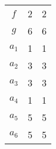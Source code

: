 \begin{center}
\begin{minipage}[t]{.4\linewidth}
\begin{longtable}[c]{| c | c | c|}
     $f$ & 2 & 2\\
     $g$ & 6 & 6\\
     $a_1$ & 1 & 1\\
     $a_2$ & 3 & 3\\
     $a_3$ & 3 & 3\\
     $a_4$ & 1 & 1\\
     $a_5$ & 5 & 5\\
     $a_6$ & 5 & 5\\
     \hline
\end{longtable}
\end{minipage}
\end{center}

